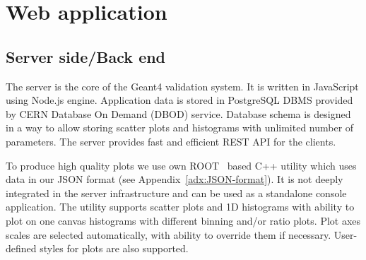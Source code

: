 \section{Web application}
\label{sec-webapplication}

\subsection{Server side/Back end}
\label{sec-webapplication-server}

The server is the core of the Geant4 validation system.
It is written in JavaScript using Node.js engine. Application data is stored in PostgreSQL DBMS provided by CERN Database On Demand (DBOD) service. Database schema is designed in a way to allow storing scatter plots and histograms with unlimited number of parameters. The server provides fast and efficient REST API for the clients.

To produce high quality plots we use own ROOT~\cite{ROOT} based C++ utility which uses data in our JSON format (see Appendix~\ref{adx:JSON-format}). It is not deeply integrated in the server infrastructure and can be used as a standalone console application. The utility supports scatter plots and 1D histograms with ability to plot on one canvas histograms with different binning and/or ratio plots. Plot axes scales are selected automatically, with ability to override them if necessary. User-defined styles for plots are also supported.


